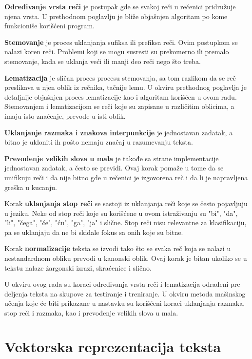 \documentclass[12pt,oneside]{memoir}
\begin{document}
\textbf{Određivanje vrsta reči} je postupak gde se svakoj reči u rečenici pridružuje njena vrsta. U prethodnom poglavlju je bliže objašnjen algoritam po kome funkcioniše korišćeni program.

\textbf{Stemovanje} je proces uklanjanja sufiksa ili prefiksa reči. Ovim postupkom se nalazi koren reči. Problemi koji se mogu susresti su prekomerno ili premalo stemovanje, kada se uklanja veći ili manji deo reči nego što treba.

\textbf{Lematizacija} je sličan proces procesu stemovanja, sa tom razlikom da se reč preslikava u njen oblik iz rečnika, tačnije lemu. U okviru prethodnog poglavlja je detaljnije objašnjen proces lematizacije kao i algoritam korišćen u ovom radu. Stemovanjem i lematizacijom se reči koje su zapisane u različitim oblicima, a imaju isto značenje, prevode u isti oblik.

\textbf{Uklanjanje razmaka i znakova interpunkcije} je jednostavan zadatak, a bitno je ukloniti ih pošto nemaju značaj u razumevanju teksta.
 
\textbf{Prevođenje velikih slova u mala} je takođe sa strane implementacije jednostavan zadatak, a često se previdi. Ovaj korak pomaže u tome da se unifikuju reči i da nije bitno gde u rečenici je izgovorena reč i da li je napravljena greška u kucanju.

Korak \textbf{uklanjanja stop reči} se sastoji iz uklanjanja reči koje se često pojavljuju u jeziku. Neke od stop reči koje su korišćene u ovom istraživanju su "bi", "da", "li", "čega", "će", "ću", "ga", "ja" i slične. Stop reči nisu relevantne za klasifikaciju, pa se uklanjaju da ne bi skidale fokus sa onih koje su bitne.

Korak \textbf{normalizacije} teksta se izvodi tako što se svaka reč koja se nalazi u nestandardnom obliku prevodi u kanonski oblik. Ovaj korak je bitan ukoliko se u tekstu nalaze žargonski izrazi, skraćenice i slično.

U okviru ovog rada su koraci određivanja vrsta reči i lematizacija odrađeni pre deljenja teksta na skupove za testiranje i treniranje. U okviru metoda mašinskog učenja koje će biti prikazane u nastavku su korišćeni koraci uklanjanja razmaka, stop reči i razmaka, kao i prevođenje velikih slova u mala.

\section{Vektorska reprezentacija teksta} \label{sec:vrt}
\end{document}
